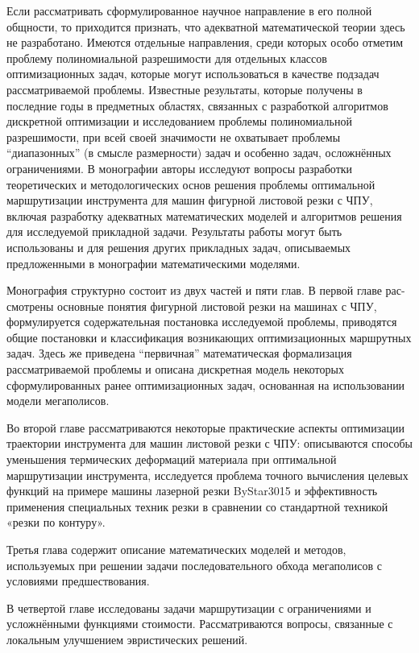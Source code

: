 \documentclass[12pt]{report}
\begin{document}
Если рассматривать сформулированное научное направление в его полной общности,
то приходится признать, что адекватной математической теории здесь не разработано.
Имеются отдельные направления, среди которых особо отметим проблему полиномиальной разрешимости
для отдельных классов оптимизационных задач,
которые могут использоваться в качестве подзадач рассматриваемой проблемы.
Известные результаты, которые получены в последние годы в предметных областях,
связанных с разработкой алгоритмов дискретной оптимизации
и исследованием проблемы полиномиальной разрешимости,
при всей своей значимости не охватывает проблемы “диапазонных”
(в смысле размерности) задач и особенно задач,
осложнённых ограничениями.
В монографии авторы исследуют вопросы разработки
теоретических и методологических основ решения проблемы
оптимальной маршрутизации инструмента для машин фигурной листовой резки с ЧПУ,
включая разработку адекватных математических моделей
и алгоритмов решения для исследуемой прикладной задачи.
Результаты работы могут быть использованы и для решения
других прикладных задач,
описываемых предложенными в монографии математическими моделями.

Монография структурно состоит из двух частей и пяти глав.
В первой главе рас-смотрены основные понятия
фигурной листовой резки на машинах с ЧПУ,
формулируется содержательная постановка исследуемой проблемы,
приводятся общие постановки и классификация
возникающих оптимизационных маршрутных задач.
Здесь же приведена “первичная” математическая формализация
рассматриваемой проблемы и описана дискретная модель
некоторых сформулированных ранее оптимизационных задач,
основанная на использовании модели мегаполисов.

Во второй главе рассматриваются некоторые
практические аспекты оптимизации траектории
инструмента для машин листовой резки с ЧПУ:
описываются способы уменьшения термических деформаций
материала при оптимальной маршрутизации инструмента,
исследуется проблема точного вычисления целевых функций
на примере машины лазерной резки ByStar3015
и эффективность применения специальных техник резки
в сравнении со стандартной техникой «резки по контуру».

Третья глава содержит описание математических моделей и методов,
используемых при решении задачи последовательного обхода
мегаполисов с условиями предшествования.

В четвертой главе исследованы задачи маршрутизации
с ограничениями и усложнёнными функциями стоимости.
Рассматриваются вопросы, связанные с
локальным улучшением эвристических решений.
\end{document}
